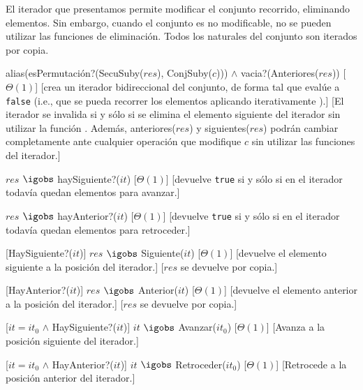 

  El iterador que presentamos permite modificar el conjunto recorrido, eliminando elementos.  Sin embargo, cuando el conjunto es no modificable, no se pueden utilizar las funciones de eliminación.  Todos los naturales del conjunto son iterados por copia.

  {alias(esPermutación?(SecuSuby($res$), ConjSuby($c$))) $\land$ vacia?(Anteriores($res$))}
  [$\Theta(1)$]
  [crea un iterador bidireccional del conjunto, de forma tal que  evalúe a \texttt{false} (i.e., que se pueda recorrer los elementos aplicando iterativamente ).]
  [El iterador se invalida si y sólo si se elimina el elemento siguiente del iterador sin utilizar la función .  Además, anteriores($res$) y siguientes($res$) podrán cambiar completamente ante cualquier operación que modifique $c$ sin utilizar las funciones del iterador.]
		
  {$res$ $\igobs$ haySiguiente?($it$)}
  [$\Theta(1)$]
  [devuelve \texttt{true} si y sólo si en el iterador todavía quedan elementos para avanzar.]

  {$res$ $\igobs$ hayAnterior?($it$)}
  [$\Theta(1)$]
  [devuelve \texttt{true} si y sólo si en el iterador todavía quedan elementos para retroceder.]

  [HaySiguiente?($it$)]
  {$res$ $\igobs$ Siguiente($it$)}
  [$\Theta(1)$]
  [devuelve el elemento siguiente a la posición del iterador.]
  [$res$ se devuelve por copia.]

  [HayAnterior?($it$)]
  {$res$ $\igobs$ Anterior($it$)}
  [$\Theta(1)$]
  [devuelve el elemento anterior a la posición del iterador.]
  [$res$ se devuelve por copia.]

  [$it = it_0$ $\land$ HaySiguiente?($it$)]
  {$it$ $\igobs$ Avanzar($it_0$)}
  [$\Theta(1)$]
  [Avanza a la posición siguiente del iterador.]

  [$it = it_0$ $\land$ HayAnterior?($it$)]
  {$it$ $\igobs$ Retroceder($it_0$)}
  [$\Theta(1)$]
  [Retrocede a la posición anterior del iterador.]

